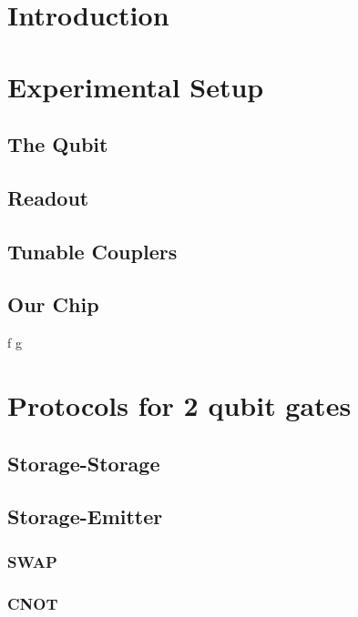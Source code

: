 \documentclass[12pt,a4paper]{report}
\begin{document}





\begingroup
    \hypersetup{linkcolor=black}
    \renewcommand\contentsname{\bfseries Contents}
    \tableofcontents
\endgroup


\chapter*{Introduction}
\chapter{Experimental Setup}
\section{The Qubit}
\section{Readout}
\section{Tunable Couplers}
\section{Our Chip}
f
\newpage
g

\chapter{Protocols for 2 qubit gates}
\section{Storage-Storage}
\section{Storage-Emitter}
\subsection{SWAP}
\subsection{CNOT}

\printbibliography[heading=bibintoc]
\end{document}

